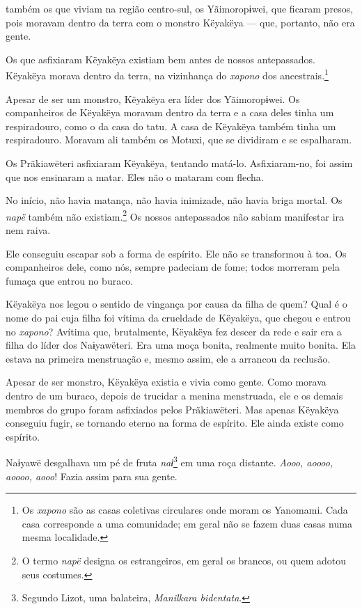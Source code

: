  também os que viviam na região centro-sul, os
Yãimoropɨwei, que ficaram presos, pois moravam dentro da terra com o
monstro Këyakëya --- que, portanto, não era gente. 

Os que asfixiaram Këyakëya existiam bem antes de nossos antepassados.
Këyakëya morava dentro da terra, na vizinhança do \textit{xapono} dos
ancestrais.\footnote{Os \textit{xapono} são as casas coletivas circulares onde moram os Yanomami. Cada casa corresponde a uma comunidade; em geral não se fazem duas casas numa mesma localidade.} 

Apesar de ser um monstro, Këyakëya era líder dos Yãimoropɨwei. Os
companheiros de Këyakëya moravam dentro da terra e a casa deles tinha um
respiradouro, como o da casa do tatu. A casa de Këyakëya também tinha um
respiradouro. Moravam ali também os Motuxi, que se dividiram e se
espalharam.

Os Prãkiawëteri asfixiaram Këyakëya, tentando matá-lo. Asfixiaram-no,
 foi assim que nos ensinaram a matar. Eles não o mataram com flecha. 

No início, não havia matança, não havia inimizade, não havia briga
mortal. Os \textit{napë} também não existiam.\footnote{O termo \textit{napë} designa os estrangeiros, em geral os brancos, ou quem adotou seus costumes.} Os nossos antepassados não sabiam manifestar ira nem raiva. 

Ele conseguiu escapar sob a forma de espírito. Ele não se transformou à
 toa. Os companheiros dele, como nós, sempre padeciam de fome; todos
 morreram pela fumaça que entrou no buraco.

Këyakëya nos legou o sentido de vingança por causa da filha de quem?
Qual é o nome do pai cuja filha foi vítima da crueldade de Këyakëya, que
chegou e entrou no \textit{xapono}? Avítima que, brutalmente, Këyakëya fez
descer da rede e sair era a filha do líder dos Naɨyawëteri. Era uma moça
bonita, realmente muito bonita. Ela estava na primeira menstruação e,
mesmo assim, ele a arrancou da reclusão.

Apesar de ser monstro, Këyakëya existia e vivia como gente. Como
 morava dentro de um buraco, depois de trucidar a menina menstruada, ele
 e os demais membros do grupo foram asfixiados pelos Prãkiawëteri. Mas
 apenas Këyakëya conseguiu fugir, se tornando eterno na forma de
 espírito. Ele ainda existe como espírito.

Naɨyawë desgalhava um pé de fruta \textit{naɨ}\footnote{ Segundo Lizot, uma balateira, \textit{Manilkara bidentata}.} em uma roça
distante. \textit{Aooo, aoooo, aoooo, aooo}! Fazia assim para sua gente. 

